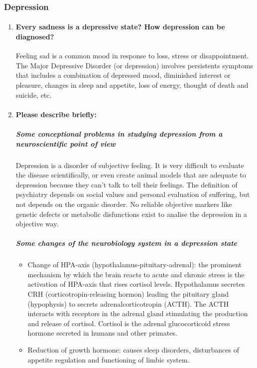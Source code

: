 \documentclass[12pt,article,oneside,a4paper]{memoir}
\begin{document}
\subsubsection{Depression}
\begin{enumerate}
\item \paragraph{Every sadness is a depressive state? How depression can be
diagnosed?}

Feeling sad is a common mood in response to loss, stress or disappointment.
The Major Depressive Disorder (or depression) involves persistents symptoms
that includes a combination of depressed mood, diminished interest or pleasure,
changes in sleep and appetite, loss of energy, thought of death and suicide,
etc.

\item \paragraph{Please describe briefly:}
\subparagraph{Some conceptional problems in studying depression from a
neuroscientific point of view} 

Depression is a disorder of subjective feeling. It is very difficult to
evaluate the disease scientifically, or even create animal models that are
adequate to depression because they can't talk to tell their feelings. The
definition of psychiatry depends on social values and personal evaluation of
suffering, but not depends on the organic disorder. No reliable objective
markers like genetic defects or metabolic disfunctions exist to analise the
depression in a objective way.

\subparagraph{Some changes of the neurobiology system in a depression state}
\label{question:neurobiology-depression}
\begin{itemize}
\item Change of HPA-axis (hypothalamus-pituitary-adrenal): the prominent
mechanism by which the brain reacts to acute and chronic stress is the
activation of HPA-axis that rises cortisol levels. Hypothalamus secretes CRH
(corticotropin-releasing hormon) leading the pituitary gland (hypophysis) to
secrets adrenalcorticotropin (ACTH). The ACTH interacts with receptors in the
adrenal gland stimulating the production and release of cortisol. Cortisol is
the adrenal glucocorticoid stress hormone secreted in humans and other
primates.
\item Reduction of growth hormone: causes sleep disorders, disturbances of
appetite regulation and functioning of limbic system.
\end{itemize}

\end{enumerate}
\end{document}
